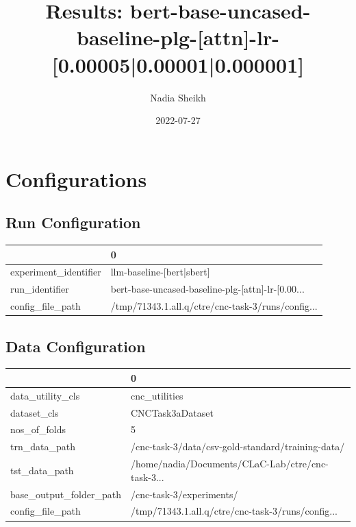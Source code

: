 \documentclass{article}
\title{Results: bert-base-uncased-baseline-plg-[attn]-lr-[0.00005|0.00001|0.000001]}
\author{Nadia Sheikh}
\date{2022-07-27}
\begin{document}
\maketitle
\section{Configurations}
\subsection{Run Configuration}
\begin{tabular}{ll}
\toprule
{} &                                                  0 \\
\midrule
experiment\_identifier &                          llm-baseline-[bert|sbert] \\
run\_identifier        &  bert-base-uncased-baseline-plg-[attn]-lr-[0.00... \\
config\_file\_path      &  /tmp/71343.1.all.q/ctre/cnc-task-3/runs/config... \\
\bottomrule
\end{tabular}

\subsection{Data Configuration}
\begin{tabular}{ll}
\toprule
{} &                                                  0 \\
\midrule
data\_utility\_cls        &                                      cnc\_utilities \\
dataset\_cls             &                                   CNCTask3aDataset \\
nos\_of\_folds            &                                                  5 \\
trn\_data\_path           &  /cnc-task-3/data/csv-gold-standard/training-data/ \\
tst\_data\_path           &  /home/nadia/Documents/CLaC-Lab/ctre/cnc-task-3... \\
base\_output\_folder\_path &                           /cnc-task-3/experiments/ \\
config\_file\_path        &  /tmp/71343.1.all.q/ctre/cnc-task-3/runs/config... \\
\bottomrule
\end{tabular}
\end{document}

